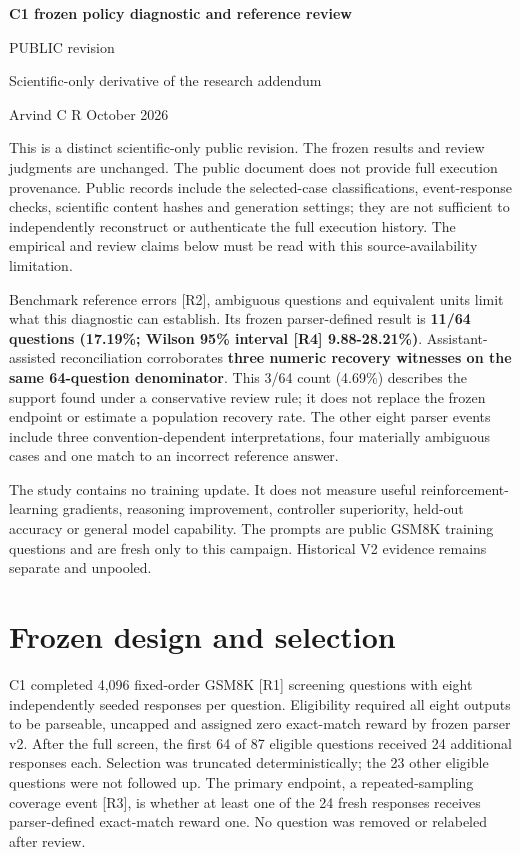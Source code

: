 \documentclass[11pt,a4paper]{article}
\begin{document}
{\Large\bfseries C1 frozen policy diagnostic and reference review\par}
\vspace{0.5em}
{\large PUBLIC revision\par}
{\normalsize Scientific-only derivative of the research addendum\par}
{\normalsize Arvind C R October 2026\par}
\vspace{1em}
This is a distinct scientific-only public revision. The frozen results
and review judgments are unchanged. The public document does not provide
full execution provenance. Public records include the selected-case
classifications, event-response checks, scientific content hashes and
generation settings; they are not sufficient to independently
reconstruct or authenticate the full execution history. The empirical
and review claims below must be read with this source-availability
limitation.

Benchmark reference errors {[}R2{]}, ambiguous questions and equivalent
units limit what this diagnostic can establish. Its frozen
parser-defined result is \textbf{11/64 questions (17.19\%; Wilson 95\%
interval {[}R4{]} 9.88-28.21\%)}. Assistant-assisted reconciliation
corroborates \textbf{three numeric recovery witnesses on the same
64-question denominator}. This 3/64 count (4.69\%) describes the support
found under a conservative review rule; it does not replace the frozen
endpoint or estimate a population recovery rate. The other eight parser
events include three convention-dependent interpretations, four
materially ambiguous cases and one match to an incorrect reference
answer.

The study contains no training update. It does not measure useful
reinforcement-learning gradients, reasoning improvement, controller
superiority, held-out accuracy or general model capability. The prompts
are public GSM8K training questions and are fresh only to this campaign.
Historical V2 evidence remains separate and unpooled.

\section{Frozen design and selection}\label{frozen-design-and-selection}

C1 completed 4,096 fixed-order GSM8K {[}R1{]} screening questions with
eight independently seeded responses per question. Eligibility required
all eight outputs to be parseable, uncapped and assigned zero
exact-match reward by frozen parser v2. After the full screen, the first
64 of 87 eligible questions received 24 additional responses each.
Selection was truncated deterministically; the 23 other eligible
questions were not followed up. The primary endpoint, a
repeated-sampling coverage event {[}R3{]}, is whether at least one of
the 24 fresh responses receives parser-defined exact-match reward one.
No question was removed or relabeled after review.
\end{document}
